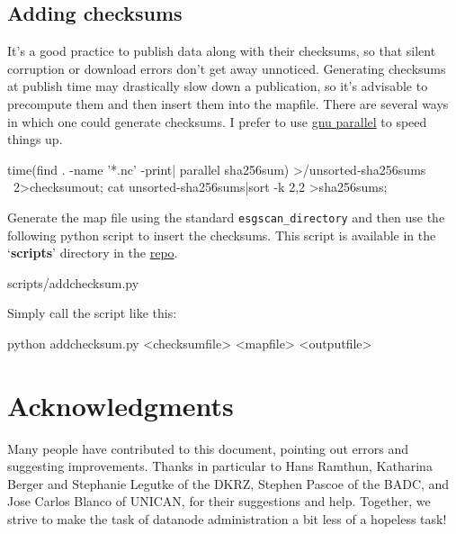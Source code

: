 \subsection{Adding checksums}
It's a good practice to publish data along with their checksums, so that silent corruption or download errors don't get away unnoticed. Generating checksums at publish time may drastically slow down a publication, so it's advisable to precompute them and then insert them into the mapfile. There are several ways in which one could generate checksums. I prefer to use \href{http://www.gnu.org/software/parallel}{gnu parallel} to speed things up.
\begin{verbatimtab}
time(find . -name '*.nc' -print| parallel sha256sum) >/unsorted-sha256sums \
2>checksumout;
cat unsorted-sha256sums|sort -k 2,2 >sha256sums;
\end{verbatimtab}
Generate the map file using the standard \texttt{esgscan\_directory} and then use the following python script to insert the checksums. This script is available in the `\textbf{scripts}' directory in the \href{https://github.com/snic-nsc/datanode-mgr-doc.git}{repo}.
\begin{tiny}
\begin{verbatimtabinput}[4]{scripts/addchecksum.py}
\end{verbatimtabinput}
\end{tiny}
Simply call the script like this:
\begin{verbatimtab}
python addchecksum.py <checksumfile> <mapfile> <outputfile>
\end{verbatimtab}
\section{Acknowledgments}
Many people have contributed to this document, pointing out errors and suggesting improvements. Thanks in particular to Hans Ramthun, Katharina Berger and Stephanie Legutke of the DKRZ, Stephen Pascoe of the BADC, and  Jose Carlos Blanco of UNICAN, for their suggestions and help. Together, we strive to make the task of datanode administration a bit less of a hopeless task!
